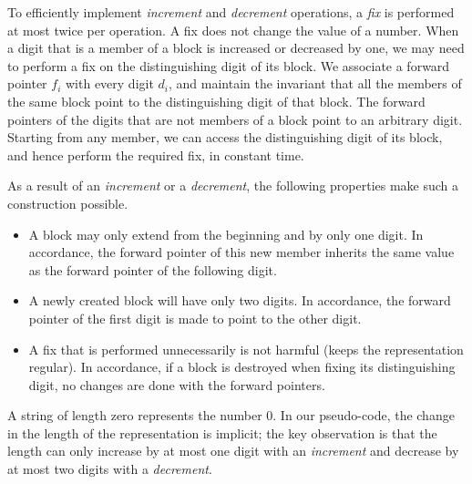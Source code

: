 \documentclass{llncs}
\begin{document}
To efficiently implement \emph{increment} and \emph{decrement} operations, a
\emph{fix} is performed at most twice per operation.  A fix does not
change the value of a number.  When a digit that is a member of a
block is increased or decreased by one, we may need to perform a fix
on the distinguishing digit of its block.  We associate a forward
pointer $f_i$ with every digit $d_i$, and maintain the invariant that
all the members of the same block point to the distinguishing digit of
that block. The forward pointers of the digits that are not members of 
a block point to an arbitrary digit.  Starting from any member, 
we can access the distinguishing digit of its block, 
and hence perform the required fix, in constant time.
 
As a result of an \emph{increment} or a \emph{decrement}, the 
following properties make such a construction possible.
\begin{itemize}
\vspace{-.1in}
\item A block may only extend from the beginning and by only one digit.
In accordance, the forward pointer of this new member inherits the same value as the forward pointer of the following digit.
\item A newly created block will have only two digits.
In accordance, the forward pointer of the first digit is made to point to the other digit.
\item A fix that is performed unnecessarily is not harmful (keeps the representation regular). 
In accordance, if a block is destroyed when fixing its distinguishing digit, no changes are done with the forward pointers.
\vspace{-.1in}
\end{itemize}
A string of length zero represents the number $0$. In our pseudo-code,
the change in the length of the representation is implicit; 
the key observation is that the length can only increase by at most one digit 
with an \emph{increment} and decrease by at most two digits with a \emph{decrement}. 
\end{document}
